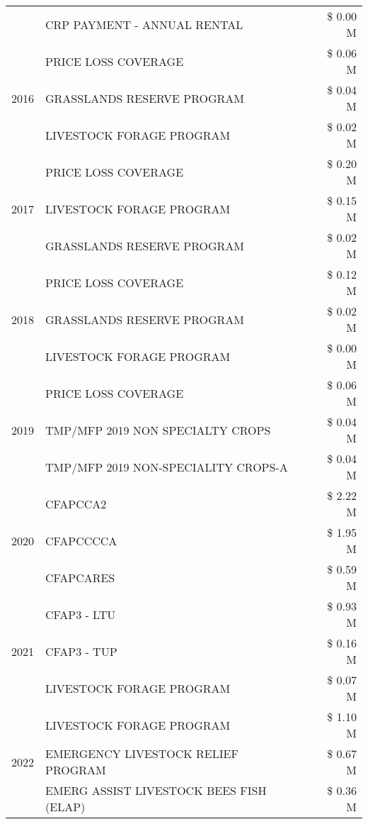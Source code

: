 \begin{tabular}{llr}
 & CRP PAYMENT - ANNUAL RENTAL & \$ 0.00 M \\
\cline{1-3}
\multirow[t]{3}{*}{2016} & PRICE LOSS COVERAGE & \$ 0.06 M \\
 & GRASSLANDS RESERVE PROGRAM & \$ 0.04 M \\
 & LIVESTOCK FORAGE PROGRAM & \$ 0.02 M \\
\cline{1-3}
\multirow[t]{3}{*}{2017} & PRICE LOSS COVERAGE & \$ 0.20 M \\
 & LIVESTOCK FORAGE PROGRAM & \$ 0.15 M \\
 & GRASSLANDS RESERVE PROGRAM & \$ 0.02 M \\
\cline{1-3}
\multirow[t]{3}{*}{2018} & PRICE LOSS COVERAGE & \$ 0.12 M \\
 & GRASSLANDS RESERVE PROGRAM & \$ 0.02 M \\
 & LIVESTOCK FORAGE PROGRAM & \$ 0.00 M \\
\cline{1-3}
\multirow[t]{3}{*}{2019} & PRICE LOSS COVERAGE & \$ 0.06 M \\
 & TMP/MFP 2019 NON SPECIALTY CROPS & \$ 0.04 M \\
 & TMP/MFP 2019 NON-SPECIALITY CROPS-A & \$ 0.04 M \\
\cline{1-3}
\multirow[t]{3}{*}{2020} & CFAPCCA2 & \$ 2.22 M \\
 & CFAPCCCCA & \$ 1.95 M \\
 & CFAPCARES & \$ 0.59 M \\
\cline{1-3}
\multirow[t]{3}{*}{2021} & CFAP3 - LTU & \$ 0.93 M \\
 & CFAP3 - TUP & \$ 0.16 M \\
 & LIVESTOCK FORAGE PROGRAM & \$ 0.07 M \\
\cline{1-3}
\multirow[t]{3}{*}{2022} & LIVESTOCK FORAGE PROGRAM & \$ 1.10 M \\
 & EMERGENCY LIVESTOCK RELIEF PROGRAM & \$ 0.67 M \\
 & EMERG ASSIST LIVESTOCK BEES FISH (ELAP) & \$ 0.36 M \\
\cline{1-3}
\bottomrule
\end{tabular}
